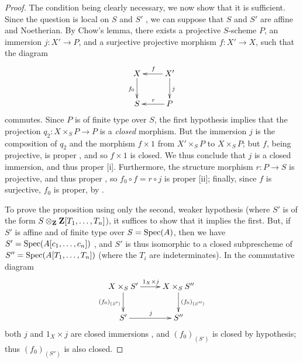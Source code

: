 \begin{proof}
\label{proof-II.5.6.3}
The condition being clearly necessary, we now show that it is sufficient.
Since the question is local on $S$ and $S'$ , we can suppose that $S$ and $S'$ are affine and Noetherian.
By Chow's lemma, there exists a projective $S$-scheme $P$, an immersion $j:X'\to P$, and a surjective projective morphism $f:X'\to X$, such that the diagram
\[
  \xymatrix{
    X\ar[d]_{f_0} &
    X'\ar[l]_f\ar[d]^j\\
    S &
    P\ar[l]_r
  }
\]
commutes.
Since $P$ is of finite type over $S$, the first hypothesis implies that the projection $q_2:X\times_S P\to P$ is a \emph{closed} morphism.
But the immersion $j$ is the composition of $q_2$ and the morphism $f\times1$ from $X'\times_S P$ to $X\times_S P$;
but $f$, being projective, is proper , and so $f\times1$ is closed.
We thus conclude that $j$ is a closed immersion, and thus proper [i].
Furthermore, the structure morphism $r:P\to S$ is projective, and thus proper , so $f_0\circ f=r\circ j$ is proper [ii];
finally, since $f$ is surjective, $f_0$ is proper, by .

To prove the proposition using only the second, weaker hypothesis (where $S'$ is of the form $S\otimes_\mathbf{Z}\mathbf{Z}[T_1,\ldots,T_n]$), it suffices to show that it implies the first.
But, if $S'$ is affine and of finite type over $S=\operatorname{Spec}(A)$,
then we have $S'=\operatorname{Spec}(A[c_1,\ldots,c_n])$ , and $S'$ is thus isomorphic to a closed subprescheme of $S''=\operatorname{Spec}(A[T_1,\ldots,T_n])$ (where the $T_i$ are indeterminates).
In the commutative diagram
\[
  \xymatrix{
    X\times_S S'\ar[r]^{1_X\times j}\ar[d]_{(f_0)_{(S')}} &
    X\times_S S''\ar[d]^{(f_0)_{(S'')}}\\
    S'\ar[r]^j &
    S''
  }
\]
both $j$ and $1_X\times j$ are closed immersions , and $(f_0)_{(S')}$ is closed by hypothesis; thus $(f_0)_{(S'')}$ is also closed.
\end{proof}

